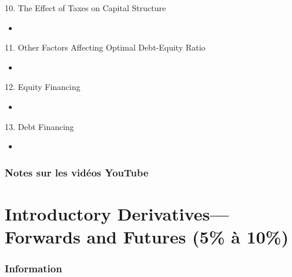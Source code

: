 \documentclass[12pt, titlepage, french]{report}
\begin{document}
\begin{CHPT_SUMM_AUTO}[label = {L.-10}]{10. The Effect of Taxes on Capital Structure}
	\begin{itemize}
		\item	
	\end{itemize}
\end{CHPT_SUMM_AUTO}

\begin{CHPT_SUMM_AUTO}[label = {L.-11}]{11. Other Factors Affecting Optimal Debt-Equity Ratio}
	\begin{itemize}
		\item	
	\end{itemize}
\end{CHPT_SUMM_AUTO}

\begin{CHPT_SUMM_AUTO}[label = {L.-12}]{12. Equity Financing}
	\begin{itemize}
		\item	
	\end{itemize}
\end{CHPT_SUMM_AUTO}

\begin{CHPT_SUMM_AUTO}[label = {L.-13}]{13. Debt Financing}
	\begin{itemize}
		\item	
	\end{itemize}
\end{CHPT_SUMM_AUTO}

\subsection{Notes sur les vidéos YouTube}


\newpage

\chapter[Introductory Derivatives---Forwards and Futures]{Introductory Derivatives---Forwards and Futures (5\% à 10\%)}

\subsection{Information}
\end{document}
